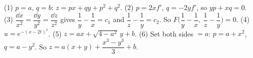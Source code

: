 \begin{answerbox}
(1) $p=a$, $q=b$: $z = px + qy + p^2 + q^2$. \quad (2) $p = 2xf'$, $q = -2yf'$, so $yp + xq = 0$. \quad (3) $\dfrac{\dd x}{x^2} = \dfrac{\dd y}{y^2} = \dfrac{\dd z}{z^2}$ gives $\dfrac1y - \dfrac1x = c_1$ and $\dfrac1z - \dfrac1y = c_2$. So $F\Big(\dfrac1y - \dfrac1x,\ \dfrac1z - \dfrac1y\Big)=0$. \quad (4) $u = e^{-(x-2t)^2}$. \quad (5) $z = ax + \sqrt{4-a^2}\,y + b$. \quad (6) Set both sides $=a$: $p = a + x^2$, $q = a - y^2$. So $z = a(x+y) + \dfrac{x^3 - y^3}{3} + b$.
\end{answerbox}

